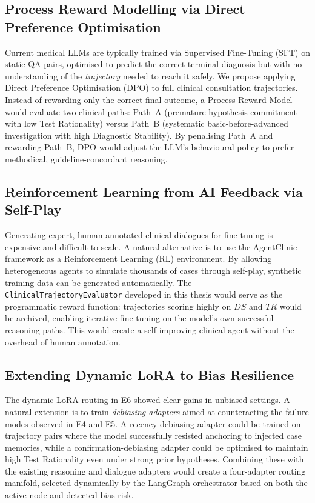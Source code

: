 \subsection{Process Reward Modelling via Direct Preference Optimisation}

Current medical LLMs are typically trained via Supervised Fine-Tuning (SFT) on static QA pairs, optimised to predict the correct terminal diagnosis but with no understanding of the \textit{trajectory} needed to reach it safely. We propose applying Direct Preference Optimisation (DPO) to full clinical consultation trajectories. Instead of rewarding only the correct final outcome, a Process Reward Model would evaluate two clinical paths: Path~A (premature hypothesis commitment with low Test Rationality) versus Path~B (systematic basic-before-advanced investigation with high Diagnostic Stability). By penalising Path~A and rewarding Path~B, DPO would adjust the LLM's behavioural policy to prefer methodical, guideline-concordant reasoning.

\subsection{Reinforcement Learning from AI Feedback via Self-Play}

Generating expert, human-annotated clinical dialogues for fine-tuning is expensive and difficult to scale. A natural alternative is to use the AgentClinic framework as a Reinforcement Learning (RL) environment. By allowing heterogeneous agents to simulate thousands of cases through self-play, synthetic training data can be generated automatically. The \texttt{ClinicalTrajectoryEvaluator} developed in this thesis would serve as the programmatic reward function: trajectories scoring highly on $DS$ and $TR$ would be archived, enabling iterative fine-tuning on the model's own successful reasoning paths. This would create a self-improving clinical agent without the overhead of human annotation.

\subsection{Extending Dynamic LoRA to Bias Resilience}

The dynamic LoRA routing in E6 showed clear gains in unbiased settings. A natural extension is to train \textit{debiasing adapters} aimed at counteracting the failure modes observed in E4 and E5. A recency-debiasing adapter could be trained on trajectory pairs where the model successfully resisted anchoring to injected case memories, while a confirmation-debiasing adapter could be optimised to maintain high Test Rationality even under strong prior hypotheses. Combining these with the existing reasoning and dialogue adapters would create a four-adapter routing manifold, selected dynamically by the LangGraph orchestrator based on both the active node and detected bias risk.

